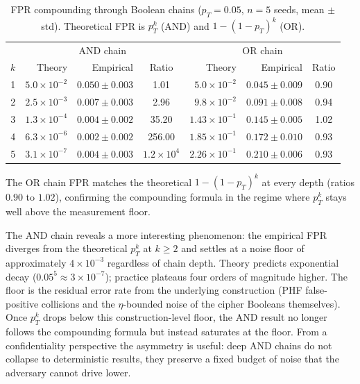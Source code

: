 \documentclass[11pt]{article}
\theoremstyle{definition}
\theoremstyle{plain}
\theoremstyle{remark}
\begin{document}
\begin{table}[ht]
\centering
\caption{FPR compounding through Boolean chains ($p_T = 0.05$,
$n = 5$ seeds, mean $\pm$ std).  Theoretical FPR is $p_T^k$ (AND)
and $1 - (1 - p_T)^k$ (OR).}
\label{tab:fpr}
\begin{tabular}{@{}crrcrrc@{}}
\toprule
& \multicolumn{3}{c}{AND chain} & \multicolumn{3}{c}{OR chain} \\
\cmidrule(lr){2-4} \cmidrule(lr){5-7}
$k$ & Theory & Empirical & Ratio & Theory & Empirical & Ratio \\
\midrule
1 & $5.0\!\times\!10^{-2}$ & $0.050 \pm 0.003$ & 1.01 & $5.0\!\times\!10^{-2}$ & $0.045 \pm 0.009$ & 0.90 \\
2 & $2.5\!\times\!10^{-3}$ & $0.007 \pm 0.003$ & 2.96 & $9.8\!\times\!10^{-2}$ & $0.091 \pm 0.008$ & 0.94 \\
3 & $1.3\!\times\!10^{-4}$ & $0.004 \pm 0.002$ & 35.20 & $1.43\!\times\!10^{-1}$ & $0.145 \pm 0.005$ & 1.02 \\
4 & $6.3\!\times\!10^{-6}$ & $0.002 \pm 0.002$ & 256.00 & $1.85\!\times\!10^{-1}$ & $0.172 \pm 0.010$ & 0.93 \\
5 & $3.1\!\times\!10^{-7}$ & $0.004 \pm 0.003$ & $1.2\!\times\!10^4$ & $2.26\!\times\!10^{-1}$ & $0.210 \pm 0.006$ & 0.93 \\
\bottomrule
\end{tabular}
\end{table}

The OR chain FPR matches the theoretical $1 - (1 - p_T)^k$ at every
depth (ratios $0.90$ to $1.02$), confirming the compounding formula
in the regime where $p_T^k$ stays well above the measurement floor.

The AND chain reveals a more interesting phenomenon: the empirical
FPR diverges from the theoretical $p_T^k$ at $k \geq 2$ and settles
at a noise floor of approximately $4 \times 10^{-3}$ regardless of
chain depth.  Theory predicts exponential decay
($0.05^5 \approx 3 \times 10^{-7}$); practice plateaus four orders
of magnitude higher.  The floor is the residual error rate from
the underlying construction (PHF false-positive collisions and the
$\eta$-bounded noise of the cipher Booleans themselves).  Once
$p_T^k$ drops below this construction-level floor, the AND result
no longer follows the compounding formula but instead saturates at
the floor.  From a confidentiality perspective the asymmetry is
useful: deep AND chains do not collapse to deterministic results,
they preserve a fixed budget of noise that the adversary cannot
drive lower.
\end{document}
